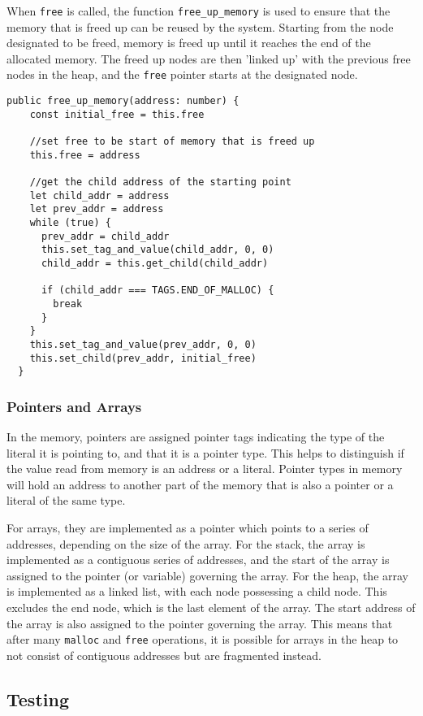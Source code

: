\documentclass[a4paper]{article}
\begin{document}
When \texttt{free} is called, the function \texttt{free\_up\_memory} is used to ensure that the memory that is freed up can be reused by the system. Starting from the node designated to be freed, memory is freed up until it reaches the end of the allocated memory. The freed up nodes are then 'linked up' with the previous free nodes in the heap, and the \texttt{free} pointer starts at the designated node.

\begin{verbatim}
public free_up_memory(address: number) {
    const initial_free = this.free

    //set free to be start of memory that is freed up
    this.free = address

    //get the child address of the starting point
    let child_addr = address
    let prev_addr = address
    while (true) {
      prev_addr = child_addr
      this.set_tag_and_value(child_addr, 0, 0)
      child_addr = this.get_child(child_addr)

      if (child_addr === TAGS.END_OF_MALLOC) {
        break
      }
    }
    this.set_tag_and_value(prev_addr, 0, 0)
    this.set_child(prev_addr, initial_free)
  }
\end{verbatim}

\subsubsection{Pointers and Arrays}
In the memory, pointers are assigned pointer tags indicating the type of the literal it is pointing to, and that it is a pointer type. This helps to distinguish if the value read from memory is an address or a literal. Pointer types in memory will hold an address to another part of the memory that is also a pointer or a literal of the same type.

For arrays, they are implemented as a pointer which points to a series of addresses, depending on the size of the array. For the stack, the array is implemented as a contiguous series of addresses, and the start of the array is assigned to the pointer (or variable) governing the array. For the heap, the array is implemented as a linked list, with each node possessing a child node. This excludes the end node, which is the last element of the array. The start address of the array is also assigned to the pointer governing the array. This means that after many \texttt{malloc} and \texttt{free} operations, it is possible for arrays in the heap to not consist of contiguous addresses but are fragmented instead.
\subsection{Testing}
\end{document}
